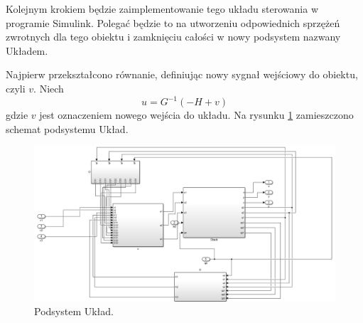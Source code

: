 \documentclass[eng,printmode]{mgr}
\begin{document}
Kolejnym krokiem będzie zaimplementowanie tego układu sterowania w programie Simulink. Polegać będzie to na utworzeniu odpowiednich sprzężeń zwrotnych dla tego obiektu i zamknięciu całości w nowy podsystem nazwany Układem. 

Najpierw przekształcono równanie, definiując nowy sygnał wejściowy do obiektu, czyli $v$.
Niech
\begin{equation}
u=G^{-1}(-H+v)
\end{equation} 
gdzie $v$ jest oznaczeniem nowego wejścia do układu. Na rysunku \ref{fig:blok5} zamieszczono schemat podsystemu Układ.
\begin{figure}[ht]
\centering
\includegraphics[width=1\textwidth]{08.png}
\caption{\label{fig:blok5}Podsystem Układ.}
\end{figure}
\end{document}
